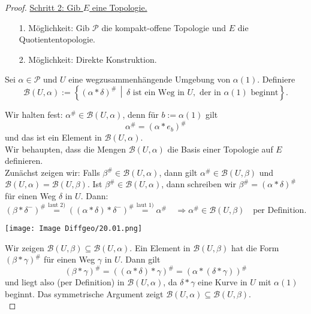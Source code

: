 \documentclass[fleqn, 12pt, letterpaper]{article}
\newcommand{\txt}[1]{\text{#1}}
\begin{document}
\begin{proof}
\bigskip
\underline{Schritt 2: Gib \( E \) eine Topologie.}
\begin{enumerate}
    \item[1.] Möglichkeit: Gib \( \mathcal{P} \) die kompakt-offene Topologie und \( E \) die Quotiententopologie.
    
    \item[2.] Möglichkeit: Direkte Konstruktion.
\end{enumerate}

Sei \(\alpha \in \mathcal{P}\) und \(U\) eine wegzusammenhängende Umgebung von \(\alpha(1)\). Definiere
\[
\mathcal{B}(U, \alpha) := \left\{ (\alpha * \delta)^{\#} \,\middle|\, \delta \text{ ist ein Weg in } U, \text{ der in } \alpha(1) \text{ beginnt} \right\}.
\]

Wir halten fest: \(\alpha^{\#} \in \mathcal{B}(U, \alpha)\), denn für \(b := \alpha(1)\) gilt 
\[
\alpha^{\#} = (\alpha * e_{b})^{\#}
\]
und das ist ein Element in \(\mathcal{B}(U, \alpha)\).\\

Wir behaupten, dass die Mengen \(\mathcal{B}(U, \alpha)\) die Basis einer Topologie auf \(E\) definieren.\\

Zunächst zeigen wir: Falls \(\beta^{\#} \in \mathcal{B}(U, \alpha)\), dann gilt \(\alpha^{\#} \in \mathcal{B}(U, \beta)\) und \(\mathcal{B}(U, \alpha) = \mathcal{B}(U, \beta)\). Ist \(\beta^{\#} \in \mathcal{B}(U, \alpha)\), dann schreiben wir \(\beta^{\#} = (\alpha * \delta)^{\#}\) für einen Weg \(\delta\) in \(U\). Dann:
\[
(\beta * \delta^{-})^{\#} \overset{\txt{laut 2)}}{=} \left( (\alpha * \delta) * \delta^{-} \right)^{\#} \overset{\txt{laut 1)}}{=} \alpha^{\#} \quad \Rightarrow \alpha^{\#} \in \mathcal{B}(U, \beta) \quad \text{per Definition}.
\]

\begin{center}
\texttt{[image: Image Diffgeo/20.01.png]}
\end{center}

Wir zeigen \(\mathcal{B}(U, \beta) \subseteq \mathcal{B}(U, \alpha)\).  
Ein Element in \(\mathcal{B}(U, \beta)\) hat die Form \((\beta * \gamma)^{\#}\) für einen Weg \(\gamma\) in \(U\). Dann gilt  
\[
(\beta * \gamma)^{\#} = ((\alpha * \delta) * \gamma)^{\#} = (\alpha * (\delta * \gamma))^{\#}
\]
und liegt also (per Definition) in \(\mathcal{B}(U, \alpha)\), da $\delta*\gamma$ eine Kurve in $U$ mit $\alpha(1)$ beginnt. Das symmetrische Argument zeigt \(\mathcal{B}(U, \alpha) \subseteq \mathcal{B}(U, \beta)\). \\


\end{proof}
\end{document}

